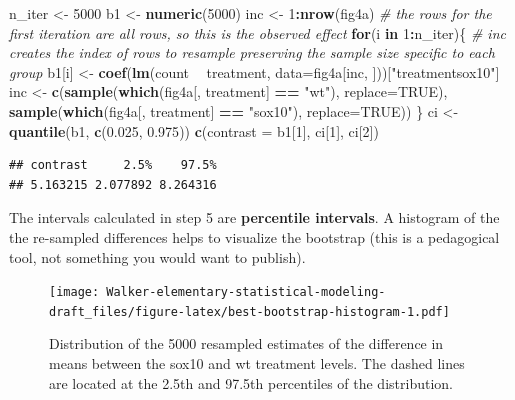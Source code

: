 \documentclass[]{book}
\newenvironment{Shaded}{\begin{snugshade}}{\end{snugshade}}
\newcommand{\CommentTok}[1]{\textcolor[rgb]{0.56,0.35,0.01}{\textit{#1}}}
\newcommand{\ControlFlowTok}[1]{\textcolor[rgb]{0.13,0.29,0.53}{\textbf{#1}}}
\newcommand{\DataTypeTok}[1]{\textcolor[rgb]{0.13,0.29,0.53}{#1}}
\newcommand{\DecValTok}[1]{\textcolor[rgb]{0.00,0.00,0.81}{#1}}
\newcommand{\FloatTok}[1]{\textcolor[rgb]{0.00,0.00,0.81}{#1}}
\newcommand{\KeywordTok}[1]{\textcolor[rgb]{0.13,0.29,0.53}{\textbf{#1}}}
\newcommand{\NormalTok}[1]{#1}
\newcommand{\OperatorTok}[1]{\textcolor[rgb]{0.81,0.36,0.00}{\textbf{#1}}}
\newcommand{\OtherTok}[1]{\textcolor[rgb]{0.56,0.35,0.01}{#1}}
\newcommand{\StringTok}[1]{\textcolor[rgb]{0.31,0.60,0.02}{#1}}
\begin{document}
\begin{Shaded}
\begin{Highlighting}[]
\NormalTok{n_iter <-}\StringTok{ }\DecValTok{5000}
\NormalTok{b1 <-}\StringTok{ }\KeywordTok{numeric}\NormalTok{(}\DecValTok{5000}\NormalTok{)}
\NormalTok{inc <-}\StringTok{ }\DecValTok{1}\OperatorTok{:}\KeywordTok{nrow}\NormalTok{(fig4a) }\CommentTok{# the rows for the first iteration are all rows, so this is the observed effect}
\ControlFlowTok{for}\NormalTok{(i }\ControlFlowTok{in} \DecValTok{1}\OperatorTok{:}\NormalTok{n_iter)\{}
  \CommentTok{# inc creates the index of rows to resample preserving the sample size specific to each group}
\NormalTok{  b1[i] <-}\StringTok{ }\KeywordTok{coef}\NormalTok{(}\KeywordTok{lm}\NormalTok{(count }\OperatorTok{~}\StringTok{ }\NormalTok{treatment, }\DataTypeTok{data=}\NormalTok{fig4a[inc, ]))[}\StringTok{"treatmentsox10"}\NormalTok{]}
\NormalTok{  inc <-}\StringTok{ }\KeywordTok{c}\NormalTok{(}\KeywordTok{sample}\NormalTok{(}\KeywordTok{which}\NormalTok{(fig4a[, treatment] }\OperatorTok{==}\StringTok{ "wt"}\NormalTok{), }\DataTypeTok{replace=}\OtherTok{TRUE}\NormalTok{),}
           \KeywordTok{sample}\NormalTok{(}\KeywordTok{which}\NormalTok{(fig4a[, treatment] }\OperatorTok{==}\StringTok{ "sox10"}\NormalTok{), }\DataTypeTok{replace=}\OtherTok{TRUE}\NormalTok{))}
\NormalTok{\}}
\NormalTok{ci <-}\StringTok{ }\KeywordTok{quantile}\NormalTok{(b1, }\KeywordTok{c}\NormalTok{(}\FloatTok{0.025}\NormalTok{, }\FloatTok{0.975}\NormalTok{))}
\KeywordTok{c}\NormalTok{(}\DataTypeTok{contrast =}\NormalTok{ b1[}\DecValTok{1}\NormalTok{], ci[}\DecValTok{1}\NormalTok{], ci[}\DecValTok{2}\NormalTok{])}
\end{Highlighting}
\end{Shaded}

\begin{verbatim}
## contrast     2.5%    97.5% 
## 5.163215 2.077892 8.264316
\end{verbatim}

The intervals calculated in step 5 are \textbf{percentile intervals}. A histogram of the the re-sampled differences helps to visualize the bootstrap (this is a pedagogical tool, not something you would want to publish).

\begin{figure}
\centering
\texttt{[image: Walker-elementary-statistical-modeling-draft\_files/figure-latex/best-bootstrap-histogram-1.pdf]}
\caption{\label{fig:best-bootstrap-histogram}Distribution of the 5000 resampled estimates of the difference in means between the sox10 and wt treatment levels. The dashed lines are located at the 2.5th and 97.5th percentiles of the distribution.}
\end{figure}
\end{document}
